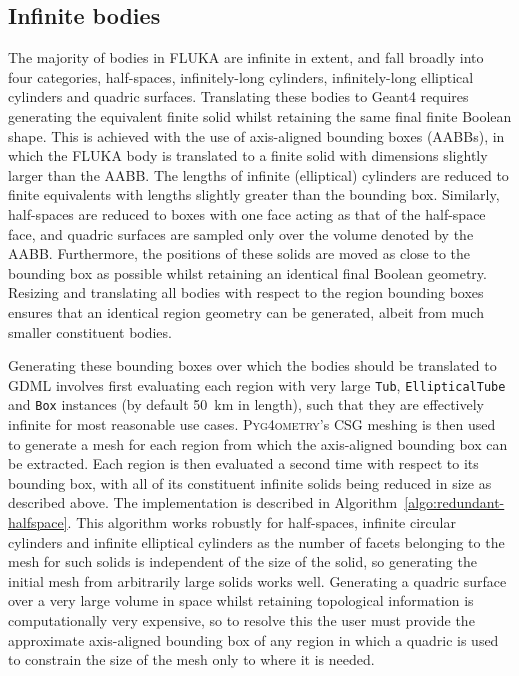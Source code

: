 \documentclass[final,5p,times,twocolumn]{elsarticle}
\newcommand{\pyinline}[1]{\lstinline[postbreak={}]{#1}}
\newcommand{\PYGEOMETRY}{\textsc{Pyg4ometry}}
\begin{document}
\subsection{Infinite bodies}
The majority of bodies in FLUKA are infinite in extent, and fall
broadly into four categories, half-spaces, infinitely-long cylinders,
infinitely-long elliptical cylinders and quadric surfaces.
Translating these bodies to Geant4 requires generating the equivalent
finite solid whilst retaining the same final finite Boolean shape.
This is achieved with the use of axis-aligned bounding boxes (AABBs),
in which the FLUKA body is translated to a finite solid with 
dimensions slightly larger than the AABB.  The lengths of infinite
(elliptical) cylinders are reduced to finite equivalents with lengths
slightly greater than the bounding box.  Similarly, half-spaces are
reduced to boxes with one face acting as that of the half-space face,
and quadric surfaces are sampled only over the volume denoted by the
AABB.  Furthermore, the positions of these solids are moved as close
to the bounding box as possible whilst retaining an identical final
Boolean geometry.   Resizing and translating all bodies with respect
to the region bounding boxes ensures that an identical region geometry can
be generated, albeit from much smaller constituent bodies.

Generating these bounding boxes over which the bodies should be translated
to GDML involves first evaluating each region with very large \pyinline{Tub},
\pyinline{EllipticalTube} and \pyinline{Box} instances (by default
\SI{50}{\km} in length), such that they are effectively infinite for most
reasonable use cases.  \PYGEOMETRY{}'s CSG meshing is then used to generate
a mesh for each region from which the axis-aligned bounding box can be
extracted.  Each region is then evaluated a second time with respect to its
 bounding box, with all of its constituent infinite solids being
reduced in size as described above.  The implementation is described in
Algorithm~\ref{algo:redundant-halfspace}. This algorithm works robustly for
half-spaces, infinite circular cylinders and infinite elliptical cylinders
as the number of facets belonging to the mesh for such solids is
independent of the size of the solid, so generating the initial mesh from
arbitrarily large solids works well.  Generating a quadric surface over a very large
volume in space whilst retaining topological information is computationally
very expensive, so to resolve this the user must provide the approximate
axis-aligned bounding box of any region in which a quadric is used to
constrain the size of the mesh only to where it is needed.
\end{document}
